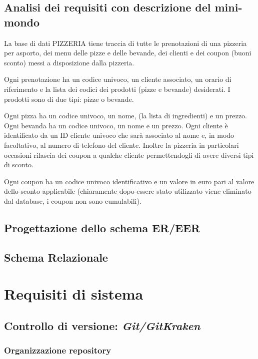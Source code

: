 \documentclass[a4paper, 12 pt]{article}
\begin{document}
		\subsection*{Analisi dei requisiti con descrizione del mini-mondo}
		La base di dati PIZZERIA tiene traccia di tutte le prenotazioni di una pizzeria per asporto,
		dei menu delle pizze e delle bevande, dei clienti e dei coupon (buoni sconto) messi a disposizione
		dalla pizzeria.
		
		Ogni prenotazione ha un codice univoco, un cliente associato, un orario di riferimento e la lista dei
		codici dei prodotti (pizze e bevande) desiderati.
		I prodotti sono di due tipi: pizze o bevande.
		
		Ogni pizza ha un codice univoco, un nome, (la lista di ingredienti) e un prezzo.
		Ogni bevanda ha un codice univoco, un nome e un prezzo.
		Ogni cliente è identificato da un ID cliente univoco che sarà associato al nome e, in modo facoltativo, al numero di telefono del cliente.
		Inoltre la pizzeria in particolari occasioni rilascia dei coupon a qualche cliente permettendogli
		di avere diversi tipi di sconto.
		
		Ogni coupon ha un codice univoco identificativo e un valore in euro pari al valore dello sconto applicabile
		(chiaramente dopo essere stato utilizzato viene eliminato dal database, i coupon non sono cumulabili).
		
		\subsection*{Progettazione dello schema ER/EER}
		\subsection*{Schema Relazionale}
	\break
	
	\section* {Requisiti di sistema}
		\subsection*{Controllo di versione: \textit{Git/GitKraken}}
			\subsubsection*{Organizzazione repository}
\end{document}
